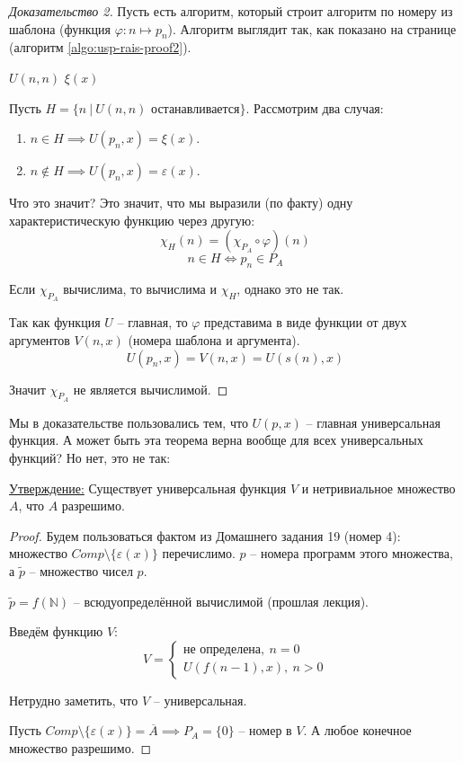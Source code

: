 \documentclass[a4paper, 12pt]{article}
\newcommand{\statement}{\underline{Утверждение:} }
\newcommand{\N}{\mathbb{N}}
\begin{document}
\begin{proof}[Доказательство 2]
    Пусть есть алгоритм, который строит алгоритм по номеру из шаблона
    (функция $\varphi : n \mapsto p_n$). Алгоритм выглядит так, как показано
    на странице \pageref{algo:usp-rais-proof2} (алгоритм \ref{algo:usp-rais-proof2}).

    \begin{algorithm}
        \caption{Шаблон алгоритма $p_n$ для функции $\varphi$ в док-ве 2}
        \label{algo:usp-rais-proof2}
        \begin{algorithmic}
                \State $U(n, n)$
                \State \Return $\xi(x)$
            \EndFunction
        \end{algorithmic}
    \end{algorithm}

    Пусть $H = \{ n\ |\ U(n, n) \text{ останавливается} \}$.
    Рассмотрим два случая:
    \begin{enumerate}
        \item $n \in H \implies U(p_n, x) = \xi(x)$.
        \item $n \notin H \implies U(p_n, x) = \varepsilon(x)$.
    \end{enumerate}
    Что это значит? Это значит, что мы выразили (по факту)
    одну характеристическую функцию через другую:
    \[ \chi_H(n) = (\chi_{P_A} \circ \varphi)(n) \]
    \[ n \in H \iff p_n \in P_A \]

    Если $\chi_{P_A}$ вычислима, то вычислима и $\chi_H$, однако это не так.

    Так как функция $U$ -- главная, то $\varphi$ представима в виде функции
    от двух аргументов $V(n, x)$ (номера шаблона и аргумента).
    \[ U(p_n, x) = V(n, x) = U(s(n), x) \]

    Значит $\chi_{P_A}$ не является вычислимой.

\end{proof}

Мы в доказательстве пользовались тем, что $U(p, x)$ -- главная универсальная
функция. А может быть эта теорема верна вообще для всех универсальных
функций? Но нет, это не так:

\statement Существует универсальная функция $V$ и нетривиальное множество $A$,
что $A$ разрешимо.
\begin{proof}
    Будем пользоваться фактом из Домашнего задания 19 (номер 4):
    множество $Comp \setminus \{\varepsilon(x)\}$ перечислимо.
    $p$ -- номера программ этого множества, а $\widetilde{p}$ -- множество чисел $p$.

    $\widetilde{p} = f(\N)$ -- всюдуопределённой вычислимой (прошлая лекция).

    Введём функцию $V$:
    \[
    V = \begin{cases}
        \text{не определена},\ n = 0 \\
        U(f(n-1), x),\ n > 0
    \end{cases}
    \]
    
    Нетрудно заметить, что $V$ -- универсальная. 

    Пусть $Comp \setminus \{\varepsilon(x)\} = \overline{A} \implies P_A = \{0\}$ 
    -- номер в $V$. А любое конечное множество разрешимо.
\end{proof}
\end{document}
